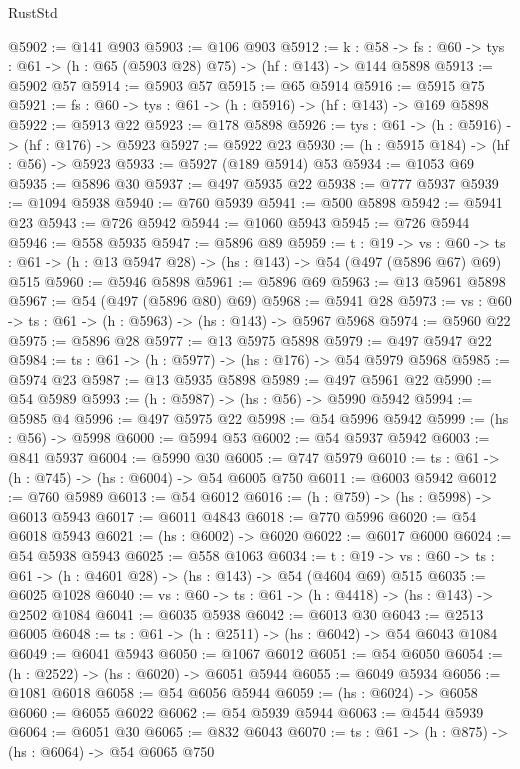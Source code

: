 \begin{lexlean}{RustStd}
\begin{coremodule}
@5902 := @141 @903
@5903 := @106 @903
@5912 := {k : @58} ->
  {fs : @60} -> {tys : @61} -> (h : @65 (@5903 @28) @75) -> (hf : @143) -> @144 @5898
@5913 := @5902 @57
@5914 := @5903 @57
@5915 := @65 @5914
@5916 := @5915 @75
@5921 := {fs : @60} -> {tys : @61} -> (h : @5916) -> (hf : @143) -> @169 @5898
@5922 := @5913 @22
@5923 := @178 @5898
@5926 := {tys : @61} -> (h : @5916) -> (hf : @176) -> @5923
@5927 := @5922 @23
@5930 := (h : @5915 @184) -> (hf : @56) -> @5923
@5933 := @5927 (@189 @5914) @53
@5934 := @1053 @69
@5935 := @5896 @30
@5937 := @497 @5935 @22
@5938 := @777 @5937
@5939 := @1094 @5938
@5940 := @760 @5939
@5941 := @500 @5898
@5942 := @5941 @23
@5943 := @726 @5942
@5944 := @1060 @5943
@5945 := @726 @5944
@5946 := @558 @5935
@5947 := @5896 @89
@5959 := {t : @19} ->
  {vs : @60} -> {ts : @61} -> (h : @13 @5947 @28) -> (hs : @143) -> @54 (@497 (@5896 @67) @69) @515
@5960 := @5946 @5898
@5961 := @5896 @69
@5963 := @13 @5961 @5898
@5967 := @54 (@497 (@5896 @80) @69)
@5968 := @5941 @28
@5973 := {vs : @60} -> {ts : @61} -> (h : @5963) -> (hs : @143) -> @5967 @5968
@5974 := @5960 @22
@5975 := @5896 @28
@5977 := @13 @5975 @5898
@5979 := @497 @5947 @22
@5984 := {ts : @61} -> (h : @5977) -> (hs : @176) -> @54 @5979 @5968
@5985 := @5974 @23
@5987 := @13 @5935 @5898
@5989 := @497 @5961 @22
@5990 := @54 @5989
@5993 := (h : @5987) -> (hs : @56) -> @5990 @5942
@5994 := @5985 @4
@5996 := @497 @5975 @22
@5998 := @54 @5996 @5942
@5999 := (hs : @56) -> @5998
@6000 := @5994 @53
@6002 := @54 @5937 @5942
@6003 := @841 @5937
@6004 := @5990 @30
@6005 := @747 @5979
@6010 := {ts : @61} -> (h : @745) -> (hs : @6004) -> @54 @6005 @750
@6011 := @6003 @5942
@6012 := @760 @5989
@6013 := @54 @6012
@6016 := (h : @759) -> (hs : @5998) -> @6013 @5943
@6017 := @6011 @4843
@6018 := @770 @5996
@6020 := @54 @6018 @5943
@6021 := (hs : @6002) -> @6020
@6022 := @6017 @6000
@6024 := @54 @5938 @5943
@6025 := @558 @1063
@6034 := {t : @19} ->
  {vs : @60} -> {ts : @61} -> (h : @4601 @28) -> (hs : @143) -> @54 (@4604 @69) @515
@6035 := @6025 @1028
@6040 := {vs : @60} -> {ts : @61} -> (h : @4418) -> (hs : @143) -> @2502 @1084
@6041 := @6035 @5938
@6042 := @6013 @30
@6043 := @2513 @6005
@6048 := {ts : @61} -> (h : @2511) -> (hs : @6042) -> @54 @6043 @1084
@6049 := @6041 @5943
@6050 := @1067 @6012
@6051 := @54 @6050
@6054 := (h : @2522) -> (hs : @6020) -> @6051 @5944
@6055 := @6049 @5934
@6056 := @1081 @6018
@6058 := @54 @6056 @5944
@6059 := (hs : @6024) -> @6058
@6060 := @6055 @6022
@6062 := @54 @5939 @5944
@6063 := @4544 @5939
@6064 := @6051 @30
@6065 := @832 @6043
@6070 := {ts : @61} -> (h : @875) -> (hs : @6064) -> @54 @6065 @750

\end{coremodule}
\end{lexlean}
